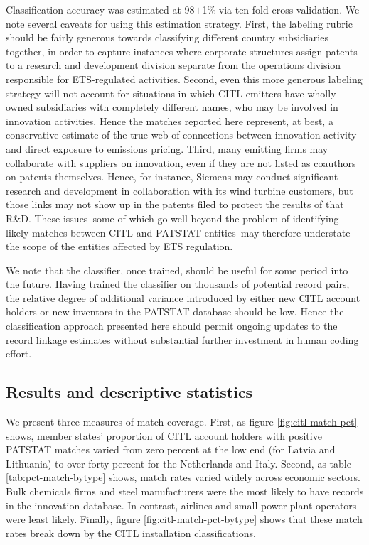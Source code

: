 \documentclass[11pt]{article}
\begin{document}
Classification accuracy was estimated at 98$\pm$1\% via ten-fold
cross-validation. We note several caveats for using this estimation
strategy. First, the labeling rubric should be fairly generous towards
classifying different country subsidiaries together, in order to
capture instances where corporate structures assign patents to a research and
development division separate from the operations division responsible
for ETS-regulated activities. Second, even this more generous labeling
strategy will not account for situations in which CITL emitters have
wholly-owned subsidiaries with completely different names, who may be
involved in innovation activities. Hence the matches reported here
represent, at best, a conservative estimate of the true web of
connections between innovation activity and direct exposure to
emissions pricing. Third, many emitting firms may collaborate with
suppliers on innovation, even if they are not listed as coauthors on
patents themselves. Hence, for instance, Siemens may conduct
significant research and development in collaboration with its wind
turbine customers, but those links may not show up in the patents
filed to protect the results of that R\&D. These issues--some of which
go well beyond the problem of identifying likely matches between CITL
and PATSTAT entities--may therefore understate the scope of the
entities affected by ETS regulation.

We note that the classifier, once trained, should be useful for some
period into the future. Having trained the classifier on thousands of
potential record pairs, the relative degree of additional variance
introduced by either new CITL account holders or new inventors in the
PATSTAT database should be low. Hence the classification approach
presented here should permit ongoing updates to the record linkage
estimates without substantial further investment in human coding effort.

\subsection{Results and descriptive statistics}
\label{sec:descr-stat}

We present three measures of match coverage. First, as figure
\ref{fig:citl-match-pct} shows, member states' proportion of CITL
account holders with positive PATSTAT matches varied from zero percent
at the low end (for Latvia and Lithuania) to over forty percent for
the Netherlands and Italy. Second, as table \ref{tab:pct-match-bytype}
shows, match rates varied widely across economic sectors. Bulk
chemicals firms and steel manufacturers were the most likely to have
records in the innovation database. In contrast, airlines and small
power plant operators were least likely. Finally, figure
\ref{fig:citl-match-pct-bytype} shows that these match rates break
down by the CITL installation classifications.
\end{document}
